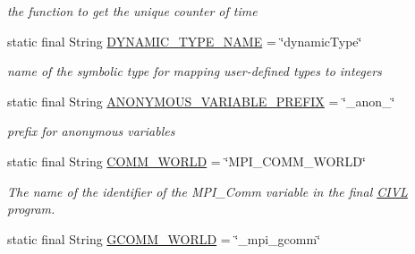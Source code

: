 \begin{DoxyCompactItemize}
\begin{DoxyCompactList}\small\item\em the function to get the unique counter of time \end{DoxyCompactList}\item 
\hypertarget{classedu_1_1udel_1_1cis_1_1vsl_1_1civl_1_1model_1_1IF_1_1ModelConfiguration_a02edf9737fe8293b93230e3a2ebd3167}{}static final String \hyperlink{classedu_1_1udel_1_1cis_1_1vsl_1_1civl_1_1model_1_1IF_1_1ModelConfiguration_a02edf9737fe8293b93230e3a2ebd3167}{D\+Y\+N\+A\+M\+I\+C\+\_\+\+T\+Y\+P\+E\+\_\+\+N\+A\+M\+E} = \char`\"{}dynamic\+Type\char`\"{}\label{classedu_1_1udel_1_1cis_1_1vsl_1_1civl_1_1model_1_1IF_1_1ModelConfiguration_a02edf9737fe8293b93230e3a2ebd3167}

\begin{DoxyCompactList}\small\item\em name of the symbolic type for mapping user-\/defined types to integers \end{DoxyCompactList}\item 
\hypertarget{classedu_1_1udel_1_1cis_1_1vsl_1_1civl_1_1model_1_1IF_1_1ModelConfiguration_a11e15466cd4c25c204973d29fe537986}{}static final String \hyperlink{classedu_1_1udel_1_1cis_1_1vsl_1_1civl_1_1model_1_1IF_1_1ModelConfiguration_a11e15466cd4c25c204973d29fe537986}{A\+N\+O\+N\+Y\+M\+O\+U\+S\+\_\+\+V\+A\+R\+I\+A\+B\+L\+E\+\_\+\+P\+R\+E\+F\+I\+X} = \char`\"{}\+\_\+anon\+\_\+\char`\"{}\label{classedu_1_1udel_1_1cis_1_1vsl_1_1civl_1_1model_1_1IF_1_1ModelConfiguration_a11e15466cd4c25c204973d29fe537986}

\begin{DoxyCompactList}\small\item\em prefix for anonymous variables \end{DoxyCompactList}\item 
\hypertarget{classedu_1_1udel_1_1cis_1_1vsl_1_1civl_1_1model_1_1IF_1_1ModelConfiguration_a6d41df450dc42695f6f1f9f0c20d5623}{}static final String \hyperlink{classedu_1_1udel_1_1cis_1_1vsl_1_1civl_1_1model_1_1IF_1_1ModelConfiguration_a6d41df450dc42695f6f1f9f0c20d5623}{C\+O\+M\+M\+\_\+\+W\+O\+R\+L\+D} = \char`\"{}M\+P\+I\+\_\+\+C\+O\+M\+M\+\_\+\+W\+O\+R\+L\+D\char`\"{}\label{classedu_1_1udel_1_1cis_1_1vsl_1_1civl_1_1model_1_1IF_1_1ModelConfiguration_a6d41df450dc42695f6f1f9f0c20d5623}

\begin{DoxyCompactList}\small\item\em The name of the identifier of the M\+P\+I\+\_\+\+Comm variable in the final \hyperlink{classedu_1_1udel_1_1cis_1_1vsl_1_1civl_1_1CIVL}{C\+I\+V\+L} program. \end{DoxyCompactList}\item 
\hypertarget{classedu_1_1udel_1_1cis_1_1vsl_1_1civl_1_1model_1_1IF_1_1ModelConfiguration_ab15807aafe06ecdfb974a18127539b96}{}static final String \hyperlink{classedu_1_1udel_1_1cis_1_1vsl_1_1civl_1_1model_1_1IF_1_1ModelConfiguration_ab15807aafe06ecdfb974a18127539b96}{G\+C\+O\+M\+M\+\_\+\+W\+O\+R\+L\+D} = \char`\"{}\+\_\+mpi\+\_\+gcomm\char`\"{}\label{classedu_1_1udel_1_1cis_1_1vsl_1_1civl_1_1model_1_1IF_1_1ModelConfiguration_ab15807aafe06ecdfb974a18127539b96}


\end{DoxyCompactItemize}
